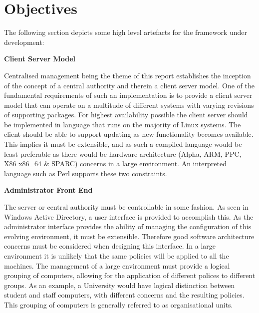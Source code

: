 \section{Objectives}

	\normalsize
	{
		The following section depicts some high level artefacts for the framework under development:
		\newline
	}

	\large{\bfseries{Client Server Model}}
	
	\vspace{2mm}
	\normalsize
	{
		Centralised management being the theme of this report establishes the inception of the concept of a central authority and 
		therein a client server model.   One of the fundamental requirements of such an implementation is to provide a client server 
		model that can operate on a multitude of different systems with varying revisions of supporting packages.  
		\newline
		\newline
		For highest availability possible the client server should be implemented in language that runs on the majority 
		of Linux systems.  The client should be able to support updating as new functionality becomes available. This implies it 
		must be extensible, and as such a compiled language would be least preferable as there would be hardware architecture (Alpha, ARM, PPC, X86 x86\_64 \& SPARC)
		concerns in a large environment.   An interpreted language such as Perl supports these two constraints.
		\newline
	}
	
	\large{\bfseries{Administrator Front End}}	
	
	\vspace{2mm}
	\normalsize
	{
		The server or central authority must be controllable in some fashion.  As seen in Windows Active Directory, 
		a user interface is provided to accomplish this.  As the administrator interface provides the ability of managing the configuration 
		of this evolving environment, it must be extensible.  Therefore good software architecture concerns must be considered 
		when designing this interface. 
		\newline
		\newline
		In a large environment it is unlikely that the same policies will be applied to all the machines.  The management of a large 
		environment must provide a logical grouping of computers, allowing for the application of different polices to different groups.  
		As an example, a University would have logical distinction between student and staff computers, with different concerns and the 
		resulting policies.  This grouping of computers is generally referred to as organisational units.
		\newline
	}
		
